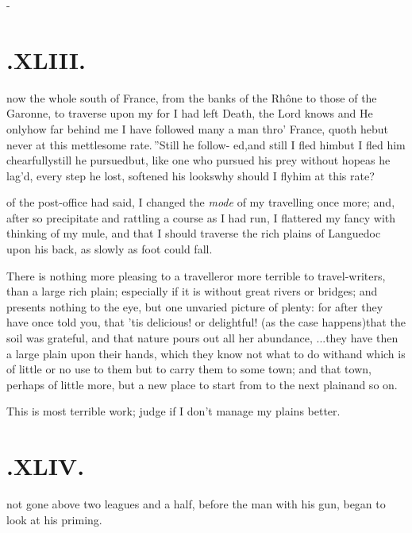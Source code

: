 \documentclass{article}
\begin{document}
\vfill{}\eject
\null\kern-\baselineskip
\section{.\enspace XLIII.}

 now the whole south of
France, from the banks of the Rhône to those of
the Garonne, to traverse upon my \break
\tsh for I had left Death, the Lord knows\break
\tsh and He only\tsk how far behind me\break
\tsh \lqq I have followed many a man thro’
France, quoth he\tsk but never at this\break
mettlesome rate.\,”\tsh Still he follow-\break
ed,\tsh and still I fled him\tsh but I fled him
chearfully\tsh still he pursued\tsh but, like one
who pursued his prey without hope\tsh as he lag’d,
every step he lost, softened his looks\tsh why should I
fly\break him at this rate?

\noindent
{}\break 
of the post-office had said, I changed the
\textit{mode} of my travelling once more; and,
after so precipitate and rattling a course as I had run, I
flattered my fancy with thinking of my mule, and that I should
traverse the rich plains of Languedoc upon his back, as
slowly as foot could fall.

There is nothing more pleasing to a traveller\tsh or
more terrible to travel-writers, than a large rich plain;
especi\-ally if it is without great rivers or bridges; and presents
nothing to the eye, but one unvaried picture of plenty: for after
they have once told you, that ’tis delicious! or delightful!
(as the case happens)\tsk that the soil was grateful, and that
nature pours out all her abundance, \etc .\@ .\@ .\@ they
have then a large plain upon their hands, which they know not
what to do with\tsk and which is of little or no use to them but
to carry them to some town; and that town, perhaps of little
more, but a new place to start from to the next plain\tsh and so
on.

\tsh This is most terrible work; judge if I don’t manage
my plains better.

\section{.\enspace XLIV.}

 not gone above two leagues and
a half, before the man with his gun, began to look at his
priming.
\end{document}
